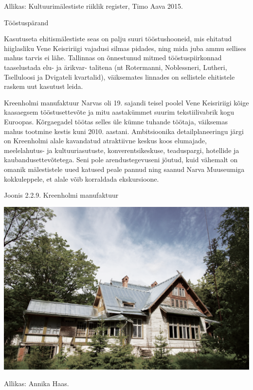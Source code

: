 \documentclass[estonian,]{article}
\begin{document}
\begin{imgsource}
{Allikas:} Kultuurimälestiste riiklik register, Timo Aava 2015.
\end{imgsource}

Tööstuspärand

Kasutuseta ehitismälestiste seas on palju suuri tööstushooneid, mis ehitatud hiiglasliku Vene Keisririigi vajadusi silmas pidades, ning mida juba ammu sellises mahus tarvis ei lähe. Tallinnas on õnnestunud mitmed tööstuspiirkonnad taaselustada elu- ja ärikvar- talitena (nt Rotermanni, Noblessneri, Lutheri, Tselluloosi ja Dvigateli kvartalid), väiksemates linnades on sellistele ehitistele raskem uut kasutust leida.

Kreenholmi manufaktuur Narvas oli 19. sajandi teisel poolel Vene Keisririigi kõige kaasaegsem tööstusettevõte ja mitu aastakümmet suurim tekstiilivabrik kogu Euroopas. Kõrgaegadel töötas selles üle kümne tuhande töötaja, väiksemas mahus tootmine kestis kuni 2010. aastani. Ambitsioonika detailplaneeringu järgi on Kreenholmi alale kavandatud atraktiivne keskus koos elumajade, meelelahutus- ja kultuuriasutuste, konverentsikeskuse, teaduspargi, hotellide ja kaubandusettevõtetega. Seni pole arendustegevuseni jõutud, kuid vähemalt on omanik mälestistele uued katused peale pannud ning saanud Narva Muuseumiga kokkuleppele, et alale võib korraldada ekskursioone.

{Joonis 2.2.9.} Kreenholmi manufaktuur

\begin{center}\includegraphics[width=0.9\linewidth]{figures/2-chapter/fig229} \end{center}

\begin{imgsource}
{Allikas:} Annika Haas.
\end{imgsource}
\end{document}
